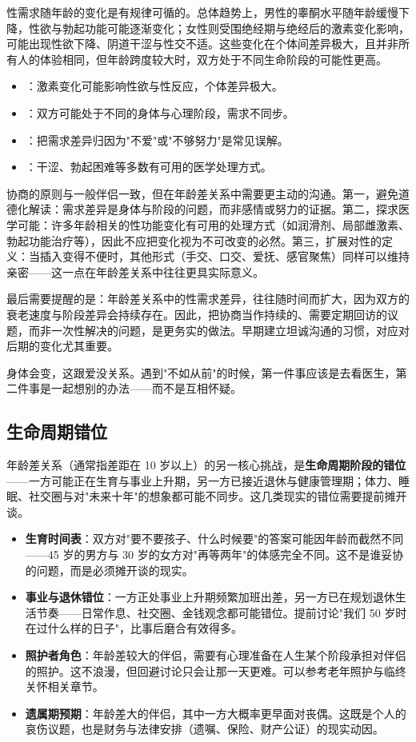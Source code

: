 性需求随年龄的变化是有规律可循的。总体趋势上，男性的睾酮水平随年龄缓慢下降，性欲与勃起功能可能逐渐变化；女性则受围绝经期与绝经后的激素变化影响，可能出现性欲下降、阴道干涩与性交不适。这些变化在个体间差异极大，且并非所有人的体验相同，但年龄跨度较大时，双方处于不同生命阶段的可能性更高。

\begin{itemize}
  \item {}：激素变化可能影响性欲与性反应，个体差异极大。
  \item {}：双方可能处于不同的身体与心理阶段，需求不同步。
  \item {}：把需求差异归因为"不爱"或"不够努力"是常见误解。
  \item {}：干涩、勃起困难等多数有可用的医学处理方式。
\end{itemize}

协商的原则与一般伴侣一致，但在年龄差关系中需要更主动的沟通。第一，避免道德化解读：需求差异是身体与阶段的问题，而非感情或努力的证据。第二，探求医学可能：许多年龄相关的性功能变化有可用的处理方式（如润滑剂、局部雌激素、勃起功能治疗等），因此不应把变化视为不可改变的必然。第三，扩展对性的定义：当插入变得不便时，其他形式（手交、口交、爱抚、感官聚焦）同样可以维持亲密——这一点在年龄差关系中往往更具实际意义。

最后需要提醒的是：年龄差关系中的性需求差异，往往随时间而扩大，因为双方的衰老速度与阶段差异会持续存在。因此，把协商当作持续的、需要定期回访的议题，而非一次性解决的问题，是更务实的做法。早期建立坦诚沟通的习惯，对应对后期的变化尤其重要。

\begin{tcolorbox}[colback=pink!5!white,colframe=red!50!black,title=贴心小叮咛]
身体会变，这跟爱没关系。遇到"不如从前"的时候，第一件事应该是去看医生，第二件事是一起想别的办法——而不是互相怀疑。
\end{tcolorbox}
\subsection{生命周期错位}

年龄差关系（通常指差距在 10 岁以上）的另一核心挑战，是\textbf{生命周期阶段的错位}——一方可能正在生育与事业上升期，另一方已接近退休与健康管理期；体力、睡眠、社交圈与对"未来十年"的想象都可能不同步。这几类现实的错位需要提前摊开谈。

\begin{itemize}
\item \textbf{生育时间表}：双方对"要不要孩子、什么时候要"的答案可能因年龄而截然不同——45 岁的男方与 30 岁的女方对"再等两年"的体感完全不同。这不是谁妥协的问题，而是必须摊开谈的现实。
\item \textbf{事业与退休错位}：一方正处事业上升期频繁加班出差，另一方已在规划退休生活节奏——日常作息、社交圈、金钱观念都可能错位。提前讨论"我们 50 岁时在过什么样的日子"，比事后磨合有效得多。
\item \textbf{照护者角色}：年龄差较大的伴侣，需要有心理准备在人生某个阶段承担对伴侣的照护。这不浪漫，但回避讨论只会让那一天更难。可以参考老年照护与临终关怀相关章节。
\item \textbf{遗属期预期}：年龄差大的伴侣，其中一方大概率更早面对丧偶。这既是个人的哀伤议题，也是财务与法律安排（遗嘱、保险、财产公证）的现实动因。
\end{itemize}
